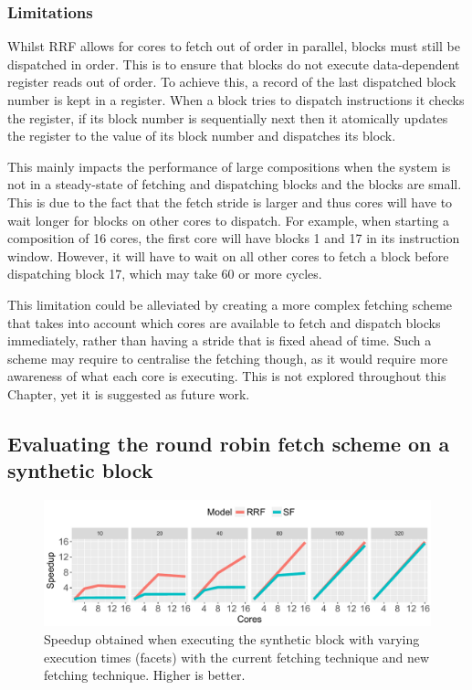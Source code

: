 \subsubsection{Limitations}

Whilst RRF allows for cores to fetch out of order in parallel, blocks must still be dispatched in order.
This is to ensure that blocks do not execute data-dependent register reads out of order.
To achieve this, a record of the last dispatched block number is kept in a register.
When a block tries to dispatch instructions it checks the register, if its block number is sequentially next then it atomically updates the register to the value of its block number and dispatches its block.

This mainly impacts the performance of large compositions when the system is not in a steady-state of fetching and dispatching blocks and the blocks are small.
This is due to the fact that the fetch stride is larger and thus cores will have to wait longer for blocks on other cores to dispatch.
For example, when starting a composition of 16 cores, the first core will have blocks 1 and 17 in its instruction window.
However, it will have to wait on all other cores to fetch a block before dispatching block 17, which may take 60 or more cycles.

This limitation could be alleviated by creating a more complex fetching scheme that takes into account which cores are available to fetch and dispatch blocks immediately, rather than having a stride that is fixed ahead of time.
Such a scheme may require to centralise the fetching though, as it would require more awareness of what each core is executing.
This is not explored throughout this Chapter, yet it is suggested as future work.

\subsection{Evaluating the round robin fetch scheme on a synthetic block}

\begin{figure}[t]
    \centering
    \includegraphics[width=1\textwidth]{chapter3/graphics/motivation_fetch.pdf}
    \caption{Speedup obtained when executing the synthetic block with varying execution times (facets) with the current fetching technique and new fetching technique. Higher is better.}
    \label{fig:new_fetch_ex}
\vspace{1em}
\end{figure}

